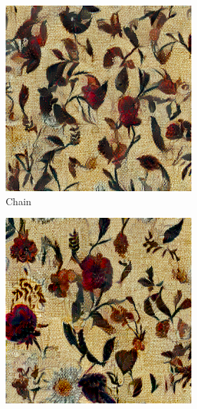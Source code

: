 \begin{figure}[ht]
\begin{subfigure}{0.8\textwidth}
        \begin{subfigure}{0.32\textwidth}
            \centering
            \includegraphics[width=\textwidth]{images/03-comparison_large_chain.jpg}
            \caption{Chain}
            \label{fig:methods_comparison_large-chain}
        \end{subfigure}
        \hfill
        \begin{subfigure}{0.32\textwidth}
            \centering
            \includegraphics[width=\textwidth]{images/03-comparison_large_pyramid.jpg}

\end{subfigure}
\end{subfigure}
\end{figure}
